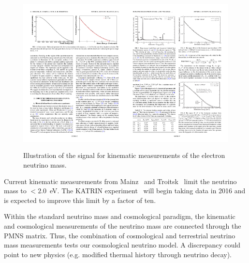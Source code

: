\begin{figure}[h!]
\centering
\includegraphics[width=0.5\textwidth]{Neutrinos/BetaDecay}\includegraphics[width=0.5\textwidth]{Neutrinos/e-capture}
\caption{Illustration of the signal for kinematic measurements of the electron neutrino mass.}
\label{fig:kinematic_mass}
\end{figure}

Current kinematic measurements from Mainz~\cite{Kraus:2004zw} and Troitsk~\cite{Aseev:2011dq} limit the neutrino mass to $< 2.0$~eV. The KATRIN experiment~\cite{Angrik:2005ep} will begin taking data in 2016 and is expected to improve this limit by a factor of ten. 

Within the standard neutrino mass and cosmological paradigm, the kinematic and cosmological measurements of the neutrino mass are connected through the PMNS matrix. Thus, the combination of cosmological and terrestrial neutrino mass measurements tests our cosmological neutrino model. A discrepancy could point to new physics (e.g. modified thermal history through neutrino decay).

